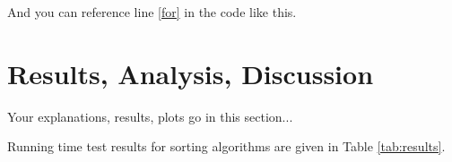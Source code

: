 \documentclass[11pt]{article}
\begin{document}
And you can reference line \ref{for} in the code like this.

\section{Results, Analysis, Discussion}

Your explanations, results, plots go in this section...

Running time test results for sorting algorithms are given in Table \ref{tab:results}.

\begin{table}[ht!]
\centering
\caption{Results of the running time tests performed for varying input sizes (in ms).}
\label{tab:results}
\end{table}
\end{document}
